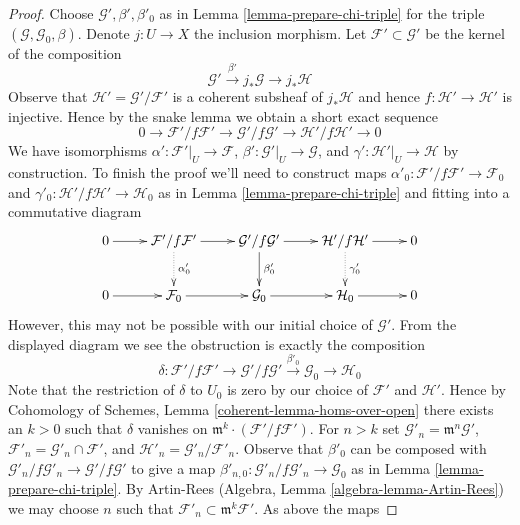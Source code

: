 \begin{proof}
Choose $\mathcal{G}', \beta', \beta'_0$ as in
Lemma \ref{lemma-prepare-chi-triple}
for the triple $(\mathcal{G}, \mathcal{G}_0, \beta)$.
Denote $j : U \to X$ the inclusion morphism.
Let $\mathcal{F}' \subset \mathcal{G}'$
be the kernel of the composition
$$
\mathcal{G}' \xrightarrow{\beta'} j_*\mathcal{G} \to j_*\mathcal{H}
$$
Observe that $\mathcal{H}' = \mathcal{G}'/\mathcal{F}'$
is a coherent subsheaf of $j_*\mathcal{H}$ and hence
$f : \mathcal{H}' \to \mathcal{H}'$ is injective.
Hence by the snake lemma we obtain a short exact sequence
$$
0 \to \mathcal{F}'/f\mathcal{F}' \to
\mathcal{G}'/f\mathcal{G}' \to
\mathcal{H}'/f\mathcal{H}' \to 0
$$
We have isomorphisms
$\alpha' : \mathcal{F}'|_U \to \mathcal{F}$,
$\beta' : \mathcal{G}'|_U \to \mathcal{G}$, and
$\gamma' : \mathcal{H}'|_U \to \mathcal{H}$ by construction.
To finish the proof we'll need to construct maps
$\alpha'_0 : \mathcal{F}'/f\mathcal{F}' \to \mathcal{F}_0$ and
$\gamma'_0 : \mathcal{H}'/f\mathcal{H}' \to \mathcal{H}_0$ as in
Lemma \ref{lemma-prepare-chi-triple} and fitting into
a commutative diagram
$$
\xymatrix{
0 \ar[r] &
\mathcal{F}'/f\mathcal{F}' \ar[r] \ar@{..>}[d]^{\alpha'_0} &
\mathcal{G}'/f\mathcal{G}' \ar[r] \ar[d]^{\beta'_0} &
\mathcal{H}'/f\mathcal{H}' \ar[r] \ar@{..>}[d]^{\gamma'_0} &
0 \\
0 \ar[r] &
\mathcal{F}_0 \ar[r] &
\mathcal{G}_0 \ar[r] &
\mathcal{H}_0 \ar[r] &
0
}
$$
However, this may not be possible with our initial choice of $\mathcal{G}'$.
From the displayed diagram we see the obstruction is
exactly the composition
$$
\delta :
\mathcal{F}'/f\mathcal{F}' \to
\mathcal{G}'/f\mathcal{G}' \xrightarrow{\beta'_0}
\mathcal{G}_0 \to
\mathcal{H}_0
$$
Note that the restriction of $\delta$ to $U_0$ is zero by our choice of
$\mathcal{F}'$ and $\mathcal{H}'$. Hence by
Cohomology of Schemes, Lemma \ref{coherent-lemma-homs-over-open}
there exists an $k > 0$ such that
$\delta$ vanishes on $\mathfrak m^k \cdot (\mathcal{F}'/f\mathcal{F}')$.
For $n > k$ set $\mathcal{G}'_n = \mathfrak m^n \mathcal{G}'$,
$\mathcal{F}'_n = \mathcal{G}'_n \cap \mathcal{F}'$, and
$\mathcal{H}'_n = \mathcal{G}'_n/\mathcal{F}'_n$.
Observe that $\beta'_0$ can be composed with
$\mathcal{G}'_n/f\mathcal{G}'_n \to \mathcal{G}'/f\mathcal{G}'$
to give a map
$\beta'_{n, 0} : \mathcal{G}'_n/f\mathcal{G}'_n \to \mathcal{G}_0$
as in Lemma \ref{lemma-prepare-chi-triple}.
By Artin-Rees (Algebra, Lemma \ref{algebra-lemma-Artin-Rees})
we may choose $n$ such that
$\mathcal{F}'_n \subset \mathfrak m^k \mathcal{F}'$.
As above the maps

\end{proof}
